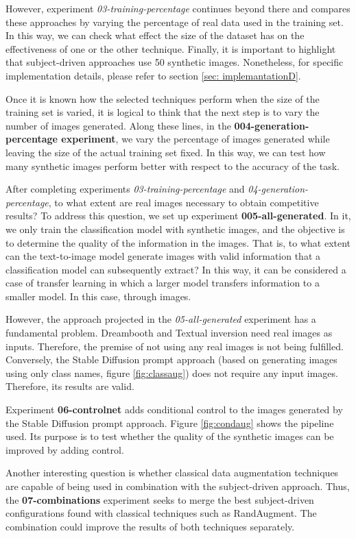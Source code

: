 However, experiment \textit{03-training-percentage} continues beyond there and compares these approaches by varying the percentage of real data used in the training set. In this way, we can check what effect the size of the dataset has on the effectiveness of one or the other technique. Finally, it is important to highlight that subject-driven approaches use 50 synthetic images. Nonetheless, for specific implementation details, please refer to section \ref{sec: implemantationD}.

Once it is known how the selected techniques perform when the size of the training set is varied, it is logical to think that the next step is to vary the number of images generated. Along these lines, in the \textbf{004-generation-percentage experiment}, we vary the percentage of images generated while leaving the size of the actual training set fixed. In this way, we can test how many synthetic images perform better with respect to the accuracy of the task.

After completing experiments \textit{03-training-percentage} and \textit{04-generation-percentage}, to what extent are real images necessary to obtain competitive results? To address this question, we set up experiment \textbf{005-all-generated}. In it, we only train the classification model with synthetic images, and the objective is to determine the quality of the information in the images. That is, to what extent can the text-to-image model generate images with valid information that a classification model can subsequently extract? In this way, it can be considered a case of transfer learning in which a larger model transfers information to a smaller model. In this case, through images.

However, the approach projected in the \textit{05-all-generated} experiment has a fundamental problem. Dreambooth and Textual inversion need real images as inputs. Therefore, the premise of not using any real images is not being fulfilled. Conversely, the Stable Diffusion prompt approach (based on generating images using only class names, figure \ref{fig:classaug}) does not require any input images. Therefore, its results are valid.

Experiment \textbf{06-controlnet} adds conditional control to the images generated by the Stable Diffusion prompt approach. Figure \ref{fig:condaug} shows the pipeline used. Its purpose is to test whether the quality of the synthetic images can be improved by adding control.

Another interesting question is whether classical data augmentation techniques are capable of being used in combination with the subject-driven approach. Thus, the \textbf{07-combinations} experiment seeks to merge the best subject-driven configurations found with classical techniques such as RandAugment. The combination could improve the results of both techniques separately. 

